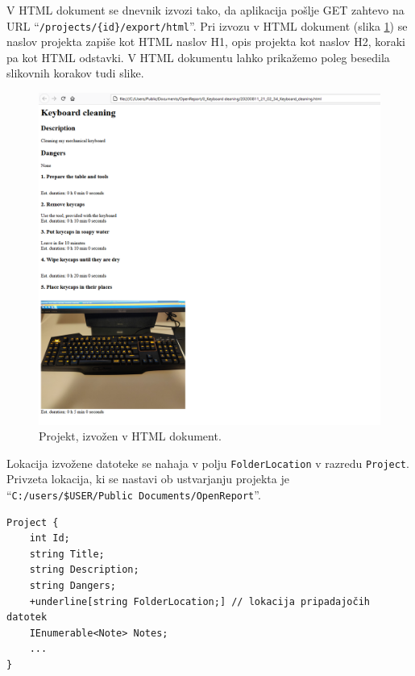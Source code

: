 \documentclass[a4paper, 12pt]{book}
\begin{document}
V HTML dokument se dnevnik izvozi tako, da aplikacija pošlje GET zahtevo na URL \enquote{\texttt{/projects/\{id\}/export/html}}.
Pri izvozu v HTML dokument (slika \ref{export_html}) se naslov projekta zapiše kot HTML naslov H1, opis projekta kot naslov H2, koraki pa kot HTML odstavki.
V HTML dokumentu lahko prikažemo poleg besedila slikovnih korakov tudi slike.

\begin{figure}[H]
\begin{center}
\includegraphics[width=13cm]{export_html}
\end{center}
\caption{Projekt, izvožen v HTML dokument.}
\label{export_html}
\end{figure}

Lokacija izvožene datoteke se nahaja v polju \texttt{FolderLocation} v razredu \texttt{Project}.
Privzeta lokacija, ki se nastavi ob ustvarjanju projekta je 
\\\enquote{\texttt{C:/users/\$USER/Public Documents/OpenReport}}.

\begin{Verbatim}[commandchars=+\[\]]
Project {
    int Id; 
    string Title; 
    string Description; 
    string Dangers; 
    +underline[string FolderLocation;] // lokacija pripadajočih datotek 
    IEnumerable<Note> Notes; 
    ... 
}
\end{Verbatim}
\end{document}
